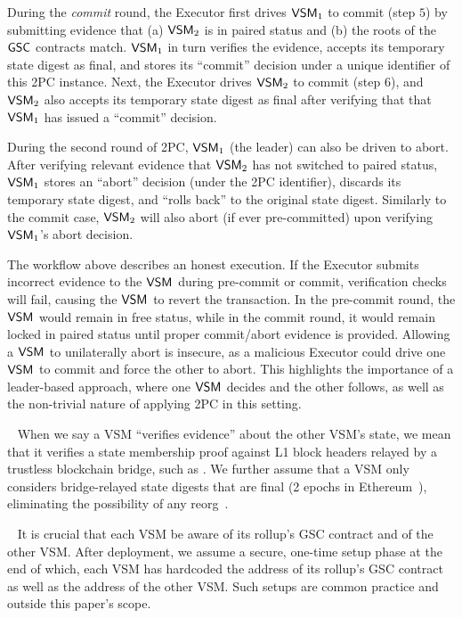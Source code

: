 During the \textit{commit} round, the Executor first drives $\mathsf{VSM}_{1}$ to commit
(step $5$) by submitting evidence that (a) $\mathsf{VSM}_{2}$ is in paired status
and (b) the roots of the $\mathsf{GSC}$ contracts match. $\mathsf{VSM}_{1}$ in turn verifies the evidence, accepts its temporary state digest as final, and stores its ``commit'' decision under a unique identifier of this 2PC instance. Next, the Executor drives $\mathsf{VSM}_{2}$ to commit (step $6$), and $\mathsf{VSM}_{2}$ also accepts its temporary state digest as final after verifying that that $\mathsf{VSM}_{1}$ has issued a ``commit'' decision.

 During the second round of 2PC, $\mathsf{VSM}_{1}$ (the leader) can also be driven to abort. After verifying relevant evidence that $\mathsf{VSM}_{2}$ has not switched to paired status, $\mathsf{VSM}_{1}$ stores an ``abort'' decision (under the 2PC identifier), discards its temporary state digest, and ``rolls back'' to the original state digest. Similarly to the commit case, $\mathsf{VSM}_{2}$ will also abort (if ever pre-committed) upon verifying $\mathsf{VSM}_{1}$'s abort decision.

 The workflow above describes an honest execution. If the Executor submits incorrect evidence to the $\mathsf{VSM}_{}$ during pre-commit or commit, verification checks will fail, causing the $\mathsf{VSM}_{}$ to revert the transaction. In the pre-commit round, the $\mathsf{VSM}_{}$ would remain in free status, while in the commit round, it would remain locked in paired status until proper commit/abort evidence is provided. Allowing a $\mathsf{VSM}_{}$ to unilaterally abort is insecure, as a malicious Executor could drive one $\mathsf{VSM}_{}$ to commit and force the other to abort. This highlights the importance of a leader-based approach, where one $\mathsf{VSM}_{}$ decides and the other follows, as well as the non-trivial nature of applying 2PC in this setting.


\begin{remark}~\label{rem:bridge-assumption}
    When we say a VSM ``verifies evidence'' about the other VSM's state, we mean that it verifies a state membership proof against L1 block headers relayed by a trustless blockchain bridge, such as \cite{xiew-zkbridge-22}. We further assume that a VSM only considers bridge-relayed state digests that are final (2 epochs in Ethereum~\cite{buterin-gasper-2020}), eliminating the possibility of any reorg~\cite{eth-org-reorg}.
\end{remark}

\begin{remark}[Setup]~\label{rem:vsm-setup}
    It is crucial that each VSM be aware of its rollup's GSC contract and of the other VSM. After deployment, we assume a secure, one-time setup phase at the end of which, each VSM has hardcoded the address of its rollup's GSC contract as well as the address of the other VSM. Such setups are common practice and outside this paper's scope.
\end{remark}



